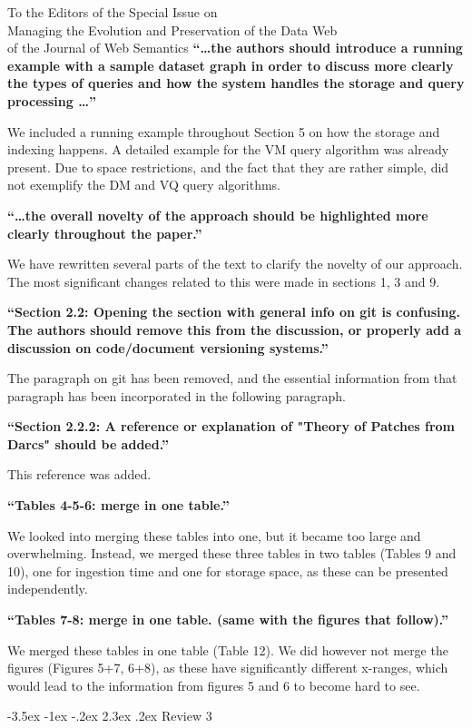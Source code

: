 \documentclass{letter}
\makeatletter
\newcounter{section}
\newcommand\section{\@startsection {section}{1}{\z@}%
                                   {-3.5ex \@plus -1ex \@minus -.2ex}%
                                   {2.3ex \@plus.2ex}%
                                   {\normalfont\Large\bfseries}}
\makeatother
\begin{document}
\begin{letter}{To the Editors of the Special Issue on\\Managing the Evolution and Preservation of the Data Web\\of the Journal of Web Semantics}
\textbf{\enquote{\ldots the authors should introduce a running example with a sample dataset graph in order to discuss more clearly the types of queries and how the system handles the storage and query processing \ldots}}

We included a running example throughout Section 5 on how the storage and indexing happens.
A detailed example for the VM query algorithm was already present.
Due to space restrictions, and the fact that they are rather simple, did not exemplify the DM and VQ query algorithms.

\pagebreak
\textbf{\enquote{\ldots the overall novelty of the approach should be highlighted more clearly throughout the paper.}}

We have rewritten several parts of the text to clarify the novelty of our approach.
The most significant changes related to this were made in sections 1, 3 and 9.

\textbf{\enquote{Section 2.2: Opening the section with general info on git is confusing. The authors should remove this from the discussion, or properly add a discussion on code/document versioning systems.}}

The paragraph on git has been removed, and the essential information from that paragraph has been incorporated in the following paragraph.

\textbf{\enquote{Section 2.2.2: A reference or explanation of "Theory of Patches from Darcs" should be added.}}

This reference was added.

\textbf{\enquote{Tables 4-5-6: merge in one table.}}

We looked into merging these tables into one,
but it became too large and overwhelming.
Instead, we merged these three tables in two tables (Tables 9 and 10),
one for ingestion time and one for storage space, as these can be presented independently.

\textbf{\enquote{Tables 7-8: merge in one table. (same with the figures that follow).}}

We merged these tables in one table (Table 12).
We did however not merge the figures (Figures 5+7, 6+8), as these have significantly different x-ranges,
which would lead to the information from figures 5 and 6 to become hard to see.

\pagebreak
\section{Review 3}


\end{letter}
\end{document}
